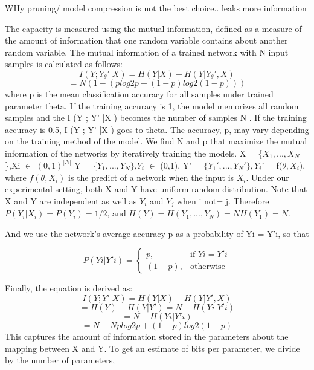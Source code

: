 





WHy pruning/ model compression is not the best choice.. leaks more information




\cite{45932}\cite{cap}
The capacity is measured using the mutual information, defined as a measure of the amount of information that one random variable contains about another random variable. The mutual information of a trained network with N input samples is calculated as follows:
\begin{equation}
I ( Y ; Y_{\theta}' | X ) = H ( Y | X ) - H ( Y | Y_{\theta}' , X )
\end{equation}
\begin{equation}
=N (1-(plog2 p+(1-p)log2 (1-p)) )
\end{equation}
where p is the mean classification accuracy for all samples under trained parameter theta. If the training accuracy is 1, the model memorizes all random samples and the I (Y ; Y' |X ) becomes the number
of samples N . If the training accuracy is 0.5, I (Y ; Y' |X ) goes to theta.
The accuracy, p, may vary depending on the training method of the model. We find N and p that maximize the mutual information of the networks by iteratively training the models.
X = \{$X_1,...,X_N$\},Xi $\in$ $(0,1)^{|N|}$
Y = $\{Y_1,...,Y_N\}$,$Y_i$ $\in$ (0,1),
Y' = $\{Y_1', ..., Y_N'\}, Y_i$' = f($\theta, X_i$),
where $f(\theta,X_i)$ is the predict of a network when the input is $X_i$. Under our experimental setting, both X and Y have uniform random distribution. Note that X and Y are independent as well as $Y_i$ and $Y_j$ when i not= j. Therefore
$P (Y_i|X_i) = P (Y_i) = 1/2$, and $H(Y) = H(Y_1, ..., Y_N ) = N H(Y_1) = N$.

And we use the network’s average accuracy p as a probability of Yi = Y'i, so that

\[
    P(Yi|Y'i)=
\begin{cases}
    p, & \text{if } Yi =Y'i\\
    (1 - p),  & \text{otherwise}
\end{cases}
\]

Finally, the equation is derived as:
\begin{equation}
I(Y;Y'|X)= H ( Y | X ) - H ( Y | Y' , X )
\end{equation}
\begin{equation}
= H ( Y ) - H ( Y | Y' ) = N -   H ( Y i | Y' i )
\end{equation}
\begin{equation}
= N -   H ( Y i | Y' i )
\end{equation}
\begin{equation}
=N-N plog2 p+(1-p)log2 (1-p)
\end{equation}
This captures
the amount of information stored in the parameters about the mapping between X and Y. To get an estimate of bits per parameter, we divide by the number of parameters,



